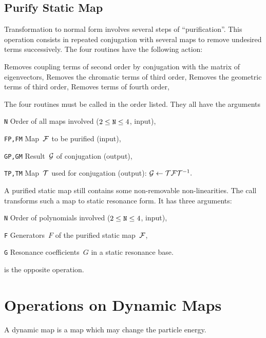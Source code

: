 \subsection{Purify Static Map}
Transformation to normal form involves several steps of
``purification''. 
This operation consists in repeated conjugation with several maps
to remove undesired terms successively.
The four routines
\label{LASPUR}
have the following action:
\begin{mylist}
Removes coupling terms of second order
by conjugation with the matrix of eigenvectors,
Removes the chromatic terms of third order,
Removes the geometric terms of third order,
Removes terms of fourth order,
\end{mylist}
The four routines must be called in the order listed.
They all have the arguments
\begin{mylist}
\item[\tt N]
Order of all maps involved ($2 \le \hbox{\tt N} \le 4$, input),
\item[\tt FP,FM]
Map~$\cal F$ to be purified (input),
\item[\tt GP,GM]
Result~$\cal G$ of conjugation (output),
\item[\tt TP,TM]
Map~$\cal T$ used for conjugation (output):
${\cal G} \leftarrow {\cal T} {\cal F} {\cal T}^{-1}.$
\end{mylist}
 
A purified static map still contains some non-removable non-linearities.
The call
transforms such a map to static resonance form.
It has three arguments:
\begin{mylist}
\item[\tt N]
Order of polynomials involved ($2 \le \hbox{\tt N} \le 4$, input),
\item[\tt F]
Generators~$F$ of the purified static map~$\cal F$,
\item[\tt G]
Resonance coefficients~$G$ in a static resonance base.
\end{mylist}
is the opposite operation.

\section{Operations on Dynamic Maps}
A dynamic map is a map which may change the particle energy.
 
